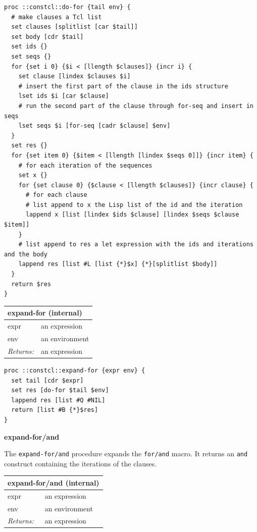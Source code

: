 \documentclass[twoside,9pt]{report}
\begin{document}
\noindent\makebox[\linewidth]{\rule{\linewidth}{0.4pt}}
\begin{lstlisting}
proc ::constcl::do-for {tail env} {
  # make clauses a Tcl list
  set clauses [splitlist [car $tail]]
  set body [cdr $tail]
  set ids {}
  set seqs {}
  for {set i 0} {$i < [llength $clauses]} {incr i} {
    set clause [lindex $clauses $i]
    # insert the first part of the clause in the ids structure
    lset ids $i [car $clause]
    # run the second part of the clause through for-seq and insert in seqs
    lset seqs $i [for-seq [cadr $clause] $env]
  }
  set res {}
  for {set item 0} {$item < [llength [lindex $seqs 0]]} {incr item} {
    # for each iteration of the sequences
    set x {}
    for {set clause 0} {$clause < [llength $clauses]} {incr clause} {
      # for each clause
      # list append to x the Lisp list of the id and the iteration
      lappend x [list [lindex $ids $clause] [lindex $seqs $clause $item]]
    }
    # list append to res a let expression with the ids and iterations and the body
    lappend res [list #L [list {*}$x] {*}[splitlist $body]]
  }
  return $res
}
\end{lstlisting}
\noindent\makebox[\linewidth]{\rule{\linewidth}{0.4pt}}
\begin{tabular}{ |l l| }
\hline
\multicolumn{2}{|l|}{expand-for (internal)} \\
\hline
expr & an expression \\
env & an environment \\
\textit{Returns:} & an expression \\
\hline
\end{tabular}

\noindent\makebox[\linewidth]{\rule{\linewidth}{0.4pt}}
\begin{lstlisting}
proc ::constcl::expand-for {expr env} {
  set tail [cdr $expr]
  set res [do-for $tail $env]
  lappend res [list #Q #NIL]
  return [list #B {*}$res]
}
\end{lstlisting}
\noindent\makebox[\linewidth]{\rule{\linewidth}{0.4pt}}

\textbf{expand-for/and}


The \texttt{expand-for/and} procedure expands the \texttt{for/and} macro. It returns an \texttt{and} construct containing the iterations of the clauses.

\begin{tabular}{ |l l| }
\hline
\multicolumn{2}{|l|}{expand-for/and (internal)} \\
\hline
expr & an expression \\
env & an environment \\
\textit{Returns:} & an expression \\
\hline
\end{tabular}
\end{document}
